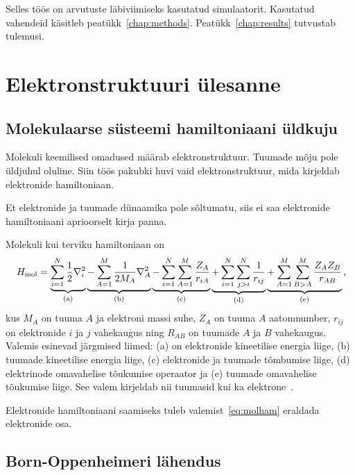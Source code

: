 \documentclass[12pt]{report}
\begin{document}
Selles töös on arvutuste läbiviimiseks kasutatud simulaatorit.
Kasutatud vahendeid käsitleb peatükk~\ref{chap:methods}.
Peatükk~\ref{chap:results} tutvustab tulemusi.

\chapter{Elektronstruktuuri ülesanne}\label{chap:qchem}

\section{Molekulaarse süsteemi hamiltoniaani üldkuju}

Molekuli keemilised omadused määrab elektronstruktuur.
Tuumade mõju pole üldjuhul oluline.
Siin töös pakubki huvi vaid elektronstruktuur, mida kirjeldab elektronide hamiltoniaan.

Et elektronide ja tuumade dünaamika pole sõltumatu, siis ei saa elektronide hamiltoniaani aprioorselt kirja panna.

Molekuli kui terviku hamiltoniaan on
\begin{align}\label{eq:molham}
    H_\text{mol} = \underbrace{\sum_{i = 1}^N \frac{1}{2} \nabla_i^2}_\text{(a)}
    \underbrace{- \sum_{A = 1}^M \frac{1}{2 M_A} \nabla_A^2}_\text{(b)}
    \underbrace{- \sum_{i = 1}^N \sum_{A = 1}^M \frac{Z_A}{r_{iA}}}_\text{(c)}
    \underbrace{+ \sum_{i = 1}^N \sum_{j > i}^N \frac{1}{r_{ij}}}_\text{(d)}
    \underbrace{+ \sum_{A = 1}^M \sum_{B > A}^M \frac{Z_A Z_B}{r_{AB}}}_\text{(e)} \rlap{,}
\end{align}
kus \(M_A\) on tuuma \(A\) ja elektroni massi suhe, \(Z_A\) on tuuma \(A\) aatomnumber, \(r_{ij}\) on elektronide \(i\) ja \(j\) vahekaugus ning \(R_{AB}\) on tuumade \(A\) ja \(B\) vahekaugus.
Valemis esinevad järgmised liimed: (a) on elektronide kineetilise energia liige, (b) tuumade kineetilise energia liige, (c) elektronide ja tuumade tõmbumise liige, (d) elektrinode omavahelise tõukumise operaator ja (e) tuumade omavahelise tõukumise liige.
See valem kirjeldab nii tuumasid kui ka elektrone~\cite{szabo+ostlund}.

Elektronide hamiltoniaani saamiseks tuleb valemist~\eqref{eq:molham} eraldada elektronide osa.

\section{Born-Oppenheimeri lähendus}\label{sec:bo}
\end{document}
